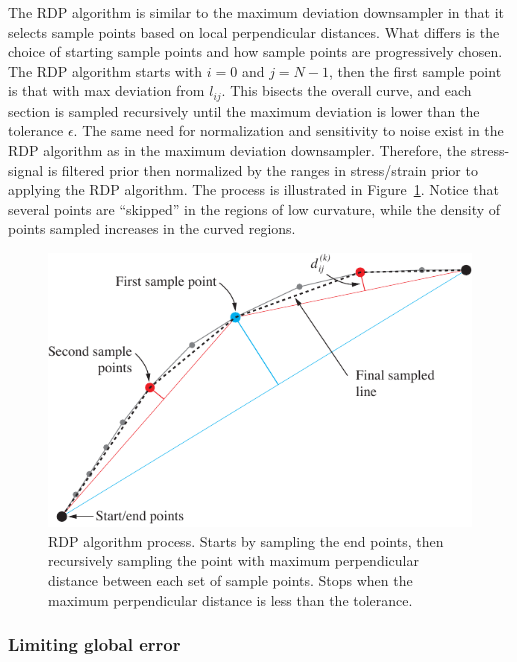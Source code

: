 \documentclass[a4paper,11pt]{article}
\begin{document}
The RDP algorithm is similar to the maximum deviation downsampler in that it selects sample points based on local perpendicular distances.
What differs is the choice of starting sample points and how sample points are progressively chosen.
The RDP algorithm starts with $i = 0$ and $j = N-1$, then the first sample point is that with max deviation from $l_{ij}$.
This bisects the overall curve, and each section is sampled recursively until the maximum deviation is lower than the tolerance $\epsilon$.
The same need for normalization and sensitivity to noise exist in the RDP algorithm as in the maximum deviation downsampler.
Therefore, the stress-signal is filtered prior then normalized by the ranges in stress/strain prior to applying the RDP algorithm.
The process is illustrated in Figure~\ref{fig:rdp-algo}.
Notice that several points are ``skipped'' in the regions of low curvature, while the density of points sampled increases in the curved regions.


\begin{figure}
    \centering
    \includegraphics[scale=1]{rdp_illustration.pdf}
    \caption{RDP algorithm process. Starts by sampling the end points, then recursively sampling the point with maximum perpendicular distance between each set of sample points. Stops when the maximum perpendicular distance is less than the tolerance.}
    \label{fig:rdp-algo}
\end{figure}

\subsubsection{Limiting global error}
\end{document}
